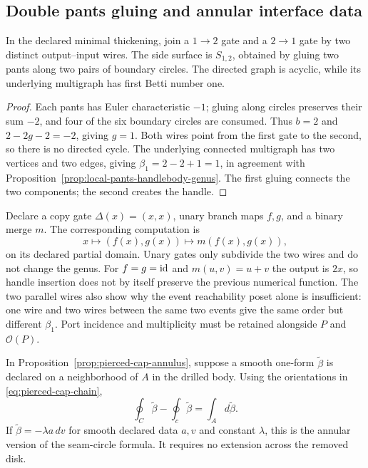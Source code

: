 \subsection{Double pants gluing and annular interface data}
\label{subsec:double-pants-annular-interface}

\begin{proposition}
\label{prop:double-pants-dag-handle}
In the declared minimal thickening, join a $1\to2$ gate and a $2\to1$ gate
by two distinct output--input wires.  The side surface is $S_{1,2}$, obtained
by gluing two pants along two pairs of boundary circles.  The directed graph
is acyclic, while its underlying multigraph has first Betti number one.
\end{proposition}

\begin{proof}
Each pants has Euler characteristic $-1$; gluing along circles preserves their
sum $-2$, and four of the six boundary circles are consumed.  Thus $b=2$ and
$2-2g-2=-2$, giving $g=1$.  Both wires point from the first gate to the second,
so there is no directed cycle.  The underlying connected multigraph has two
vertices and two edges, giving $\beta_1=2-2+1=1$, in agreement with
Proposition~\ref{prop:local-pants-handlebody-genus}.  The first gluing connects
the two components; the second creates the handle.
\end{proof}

\begin{example}
\label{ex:split-merge-handle}
Declare a copy gate $\Delta(x)=(x,x)$, unary branch maps $f,g$, and a binary
merge $m$.  The corresponding computation is
\[
 x\longmapsto(f(x),g(x))\longmapsto m(f(x),g(x)),
\]
on its declared partial domain.  Unary gates only subdivide the two wires and
do not change the genus.  For $f=g=\operatorname{id}$ and $m(u,v)=u+v$ the output is $2x$,
so handle insertion does not by itself preserve the previous numerical
function.  The two parallel wires also show why the event reachability poset
alone is insufficient: one wire and two wires between the same two events
give the same order but different $\beta_1$.  Port incidence and multiplicity
must be retained alongside $P$ and $\mathcal O(P)$.
\end{example}

\begin{proposition}
\label{prop:annular-stokes-balance}
In Proposition~\ref{prop:pierced-cap-annulus}, suppose a smooth one-form
$\widetilde\beta$ is declared on a neighborhood of $A$ in the drilled body.
Using the orientations in \eqref{eq:pierced-cap-chain},
\begin{equation}\label{eq:annular-stokes-balance}
 \oint_C\widetilde\beta-\oint_c\widetilde\beta
       =\int_A d\widetilde\beta.
\end{equation}
If $\widetilde\beta=-\lambda a\,dv$ for smooth declared data $a,v$ and constant
$\lambda$, this is the annular version of the seam-circle formula.  It requires
no extension across the removed disk.
\end{proposition}

